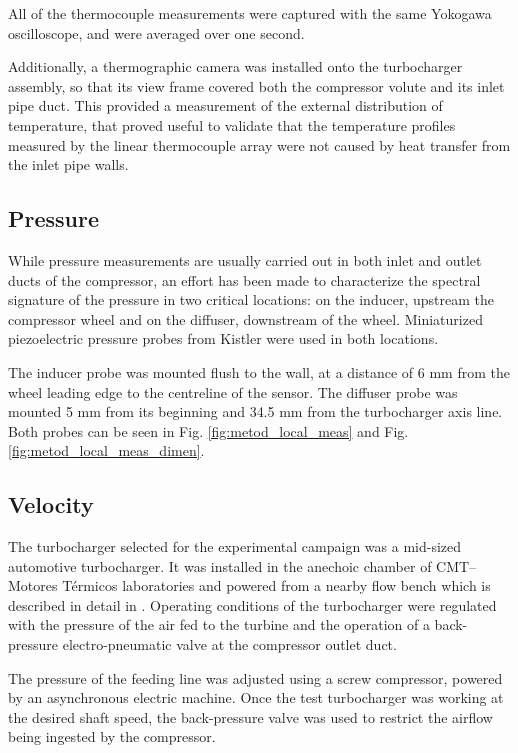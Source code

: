 All of the thermocouple measurements were captured with the same Yokogawa oscilloscope, and were averaged over one second.

Additionally, a thermographic camera was installed onto the turbocharger assembly, so that its view frame covered both the compressor volute and its inlet pipe duct. This provided a measurement of the external distribution of temperature, that proved useful to validate that the temperature profiles measured by the linear thermocouple array were not caused by heat transfer from the inlet pipe walls.

\subsection{Pressure}

While pressure measurements are usually carried out in both inlet and outlet ducts of the compressor, an effort has been made to characterize the spectral signature of the pressure in two critical locations: on the inducer, upstream the compressor wheel and on the diffuser, downstream of the wheel. Miniaturized piezoelectric pressure probes from Kistler were used in both locations. 

The inducer probe was mounted flush to the wall, at a distance of 6 mm from the wheel leading edge to the centreline of the sensor. The diffuser probe was mounted 5 mm from its beginning and 34.5 mm from the turbocharger axis line. Both probes can be seen in Fig. \ref{fig:metod_local_meas} and Fig. \ref{fig:metod_local_meas_dimen}.

\subsection{Velocity}

The turbocharger selected for the experimental campaign was a mid-sized automotive turbocharger. It was installed in the anechoic chamber of CMT--Motores Térmicos laboratories and powered from a nearby flow bench which is described in detail in \cite{galindo2006surge}. Operating conditions of the turbocharger were regulated with the pressure of the air fed to the turbine and the operation of a back-pressure electro-pneumatic valve at the compressor outlet duct.

The pressure of the feeding line was adjusted using a screw compressor, powered by an asynchronous electric machine. Once the test turbocharger was working at the desired shaft speed, the back-pressure valve was used to restrict the airflow being ingested by the compressor.

